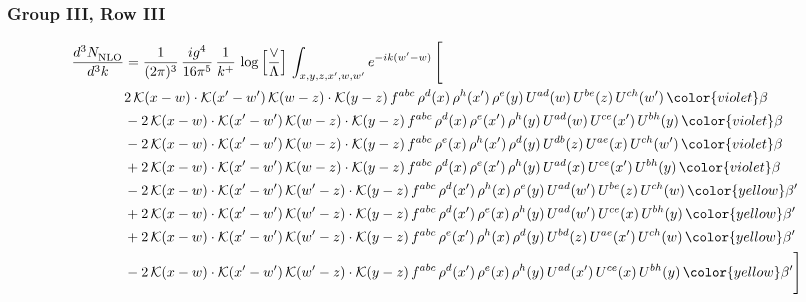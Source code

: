 \subsubsection{Group III, Row III} 
\begin{align}
     \frac{d^{3}N_{\rm NLO}^{\rm}}{d^{3}k}  & = \frac{1}{(2\pi)^{3}}\, \frac{ig^{4}}{16\pi^{5}}\, \frac{1}{k^{+}}\, \log{\left[\frac{\vee}{\Lambda}\right]}\, \int_{x,y,z,x^{\prime},w,w^{\prime}}e^{-ik(w^{\prime}-w)}\, \Bigg[\notag \\ & 2\,\mathcal{K}(x-w)\cdot \mathcal{K}(x'-w')\, \mathcal{K}(w-z)\cdot \mathcal{K}(y-z)\, f^{abc}\,\rho^{d}(x)\,\rho^{h}(x')\,\rho^{e}(y)\, U^{ad}(w)\,U^{be}(z)\,U^{ch}(w')\,{\color{violet} \beta}\notag \\ & -2\,\mathcal{K}(x-w)\cdot \mathcal{K}(x'-w')\, \mathcal{K}(w-z)\cdot \mathcal{K}(y-z)\, f^{abc}\,\rho^{d}(x)\,\rho^{e}(x')\,\rho^{h}(y)\, U^{ad}(w)\,U^{ce}(x')\,U^{bh}(y)\,{\color{violet} \beta}\notag \\ & - 2\,\mathcal{K}(x-w)\cdot \mathcal{K}(x'-w')\, \mathcal{K}(w-z)\cdot \mathcal{K}(y-z)\, f^{abc}\,\rho^{e}(x)\,\rho^{h}(x')\,\rho^{d}(y)\, U^{db}(z)\,U^{ae}(x)\,U^{ch}(w')\,{\color{violet} \beta}\notag \\ & +2\,\mathcal{K}(x-w)\cdot \mathcal{K}(x'-w')\, \mathcal{K}(w-z)\cdot \mathcal{K}(y-z)\, f^{abc}\,\rho^{d}(x)\,\rho^{e}(x')\,\rho^{h}(y)\, U^{ad}(x)\,U^{ce}(x')\,U^{bh}(y)\,{\color{violet} \beta}\notag \\ & -2\, \mathcal{K}(x-w) \cdot \mathcal{K}(x'-w')\, \mathcal{K}(w'-z) \cdot \mathcal{K}(y-z)\, f^{abc}\, \rho^{d}(x')\,\rho^{h}(x)\, \rho^{e}(y)\,U^{ad}(w')\,U^{be}(z)\,U^{ch}(w)\, {\color{yellow} \beta'}\notag \\ & + 2\, \mathcal{K}(x-w) \cdot \mathcal{K}(x'-w')\, \mathcal{K}(w'-z) \cdot \mathcal{K}(y-z)\, f^{abc}\, \rho^{d}(x')\,\rho^{e}(x)\, \rho^{h}(y)\,U^{ad}(w')\,U^{ce}(x)\,U^{bh}(y)\, {\color{yellow} \beta'}\notag \\ & +2\, \mathcal{K}(x-w) \cdot \mathcal{K}(x'-w')\, \mathcal{K}(w'-z) \cdot \mathcal{K}(y-z)\, f^{abc}\, \rho^{e}(x')\,\rho^{h}(x)\, \rho^{d}(y)\,U^{bd}(z)\,U^{ae}(x')\,U^{ch}(w)\, {\color{yellow} \beta'}\notag \\ & -2\, \mathcal{K}(x-w) \cdot \mathcal{K}(x'-w')\, \mathcal{K}(w'-z) \cdot \mathcal{K}(y-z)\, f^{abc}\, \rho^{d}(x')\,\rho^{e}(x)\, \rho^{h}(y)\,U^{ad}(x')\,U^{ce}(x)\,U^{bh}(y)\, {\color{yellow} \beta'}\Bigg]
     \end{align}     
